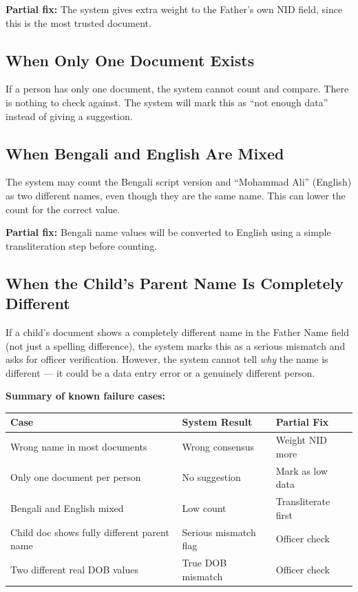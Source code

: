 \documentclass[12pt, a4paper]{article}
\begin{document}
\textbf{Partial fix:} The system gives extra weight to the Father's own
NID field, since this is the most trusted document.

\subsection{When Only One Document Exists}

If a person has only one document, the system cannot count and compare.
There is nothing to check against. The system will mark this as
``not enough data'' instead of giving a suggestion.

\subsection{When Bengali and English Are Mixed}

The system may count the Bengali script version and
``Mohammad Ali'' (English) as two different names, even though they
are the same name. This can lower the count for the correct value.

\textbf{Partial fix:} Bengali name values will be converted to English
using a simple transliteration step before counting.

\subsection{When the Child's Parent Name Is Completely Different}

If a child's document shows a completely different name in the Father
Name field (not just a spelling difference), the system marks this as
a serious mismatch and asks for officer verification. However, the
system cannot tell \textit{why} the name is different --- it could be
a data entry error or a genuinely different person.

\vspace{0.3cm}
\textbf{Summary of known failure cases:}

\begin{center}
\begin{tabular}{|p{5cm}|p{3cm}|p{4.5cm}|}
    \hline
    \textbf{Case} & \textbf{System Result} & \textbf{Partial Fix} \\
    \hline
    Wrong name in most documents & Wrong consensus & Weight NID more \\
    \hline
    Only one document per person & No suggestion & Mark as low data \\
    \hline
    Bengali and English mixed & Low count & Transliterate first \\
    \hline
    Child doc shows fully different parent name & Serious mismatch flag & Officer check \\
    \hline
    Two different real DOB values & True DOB mismatch & Officer check \\
    \hline
\end{tabular}
\end{center}
\end{document}
